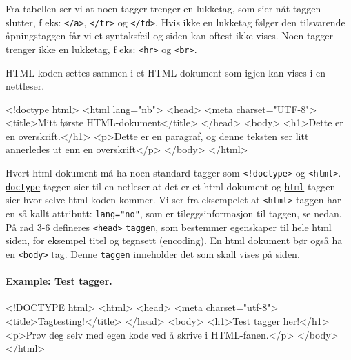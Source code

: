 \documentclass[%
oneside,                 %
final,                   %
10pt]{article}
\newenvironment{notice_mdfboxadmon}[1][]{
\begin{notice_mdfboxmdframed}[frametitle=#1]
}
{
\end{notice_mdfboxmdframed}
}
\newenvironment{block_mdfboxadmon}[1][]{
\begin{block_mdfboxmdframed}[frametitle=#1]
}
{
\end{block_mdfboxmdframed}
}
\begin{document}
Fra tabellen ser vi at noen tagger trenger en lukketag, som sier nåt
taggen slutter, f eks: \texttt{</a>}, \texttt{</tr>} og \texttt{</td>}. Hvis ikke en
lukketag følger den tilsvarende åpningstaggen får vi et syntaksfeil og
siden kan oftest ikke vises. Noen tagger trenger ikke en lukketag, f
eks: \texttt{<hr>} og \texttt{<br>}.

HTML-koden settes sammen i et HTML-dokument som igjen kan vises i en
nettleser.


\begin{block_mdfboxadmon}[]
\bhtml
<!doctype html>
<html lang="nb">
<head>
	<meta charset="UTF-8">
	<title>Mitt første HTML-dokument</title>
</head>
<body>
	<h1>Dette er en overskrift.</h1> 
	<p>Dette er en paragraf, og denne teksten ser litt annerledes 
          ut enn en overskrift</p>
</body>
</html>
\ehtml
\end{block_mdfboxadmon}



Hvert html dokument må ha noen standard tagger som \Verb?<!doctype>? og
\texttt{<html>}. \href{{http://www.w3schools.com/tags/tag_doctype.asp}}{\nolinkurl{doctype}}
taggen sier til en netleser at det er et html dokument og
\href{{http://www.w3schools.com/tags/tag_html.asp}}{\nolinkurl{html}} taggen sier hvor
selve html koden kommer. Vi ser fra eksempelet at \texttt{<html>} taggen har
en så kallt attributt: \texttt{lang="no"}, som er tileggsinformasjon til
taggen, se nedan. På rad 3-6 defineres \texttt{<head>}
\href{{http://www.w3schools.com/tags/tag_head.asp}}{\nolinkurl{taggen}}, som bestemmer
egenskaper til hele html siden, for eksempel titel og tegnsett
(encoding). En html dokument bør også ha en \texttt{<body>} tag. Denne
\href{{http://www.w3schools.com/tags/tag_body.asp}}{\nolinkurl{taggen}} inneholder det
som skall vises på siden.

\paragraph{Example: Test tagger.}
\label{example:testtagger}


\begin{notice_mdfboxadmon}
\bhtml
<!DOCTYPE html>
<html>
<head>
    <meta charset="utf-8">
    <title>Tagtesting!</title>
</head>
<body>
    <h1>Test tagger her!</h1>
    <p>Prøv deg selv med egen kode ved å skrive i HTML-fanen.</p>
</body>
</html>
\ehtml
\end{notice_mdfboxadmon}
\end{document}

